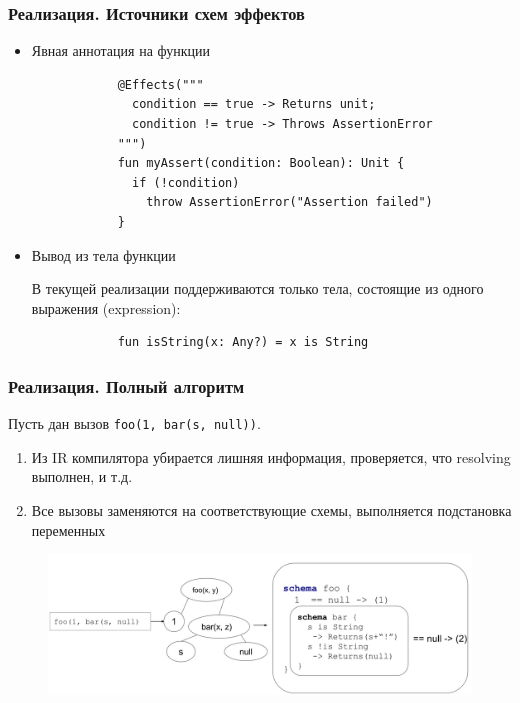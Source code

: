 \documentclass{beamer}
\newcommand{\code}[1]{\texttt{#1}}
\begin{document}
\begin{frame}[fragile, t]\frametitle{Реализация. Источники схем эффектов}
        \setlength\partopsep{-\topsep}
    \begin{itemize}
        \item Явная аннотация на функции
        
        \begin{verbatim}
            @Effects("""
              condition == true -> Returns unit;
              condition != true -> Throws AssertionError
            """)
            fun myAssert(condition: Boolean): Unit {
              if (!condition) 
                throw AssertionError("Assertion failed")
            }    
        \end{verbatim}
        
        \item Вывод из тела функции
        
        В текущей реализации поддерживаются только тела, состоящие из одного выражения (expression):
        
        \begin{verbatim}
            fun isString(x: Any?) = x is String
        \end{verbatim}
    \end{itemize}
\end{frame}

\begin{frame}[fragile, t]\frametitle{Реализация. Полный алгоритм}
    Пусть дан вызов \code{foo(1, bar(s, null))}. 
    
    \begin{enumerate}
        \item Из IR компилятора убирается лишняя информация, проверяется, что resolving выполнен, и т.д.
        \item Все вызовы заменяются на соответствующие схемы, выполняется подстановка переменных
    \end{enumerate}
    
    \begin{figure}
            \centerline{\includegraphics[width=\paperwidth]{pipeline-1}}
    \end{figure}
\end{frame}
\end{document}
